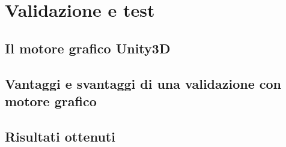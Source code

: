 \section{Validazione e test}
\label{sec:test}

\subsection{Il motore grafico Unity3D}
\label{sec:unity}

\subsection{Vantaggi e svantaggi di una validazione con motore grafico}
\label{sec:valid}

\subsection{Risultati ottenuti}
\label{sec:perf}